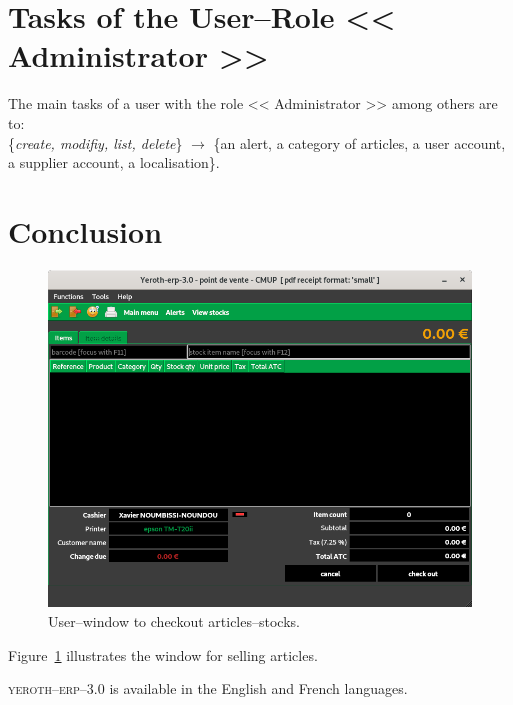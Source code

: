 \documentclass[a4paper, 10pt, twocolumn]{article}
\newcommand{\yeren}{\textsc{yeroth--erp--3.0}\xspace}
\newcommand{\administrator}{<< Administrator >>\xspace}
\begin{document}
\vspace{-1.1em}
\section{Tasks of the User--Role \administrator}\label{tachesadmin}
\vspace{-0.3em}
The main tasks of a user with the role \administrator
among others are to:\\
\{\emph{create, modifiy, list, delete}\} $\longrightarrow$
\hspace{0.09cm} \{an alert, a category of articles,
a user account, a supplier account, a localisation\}.

\vspace{-0.5em}
\section{Conclusion}
\vspace{-0.9em}
\begin{figure}[!htbp]
\centering
\includegraphics[scale=0.33]{../../francais/images/yeren-pos-7-0-window-cashier.png}
\caption{User--window to checkout articles--stocks.}
\label{fig:fenetre-de-vente}
\end{figure}

Figure~\ref{fig:fenetre-de-vente} illustrates the window
for selling articles.

\yeren is available in the English and French languages.
\end{document}
